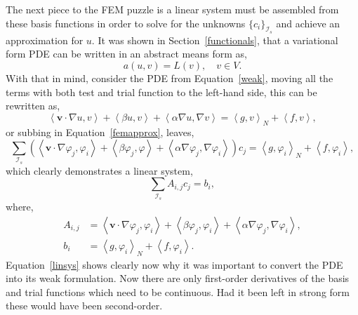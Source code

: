 The next piece to the FEM puzzle is a linear system must be assembled from these basis functions in order to solve for the unknowns $\{c_i\}_{\mathcal{I}_s}$ and achieve an approximation for $u$. It was shown in Section~\ref{functionals}, that a variational form PDE can be written in an abstract means form as,
\begin{equation}
	a(u,v) = L(v),\quad v\in V.
\end{equation}
With that in mind, consider the PDE from Equation~\eqref{weak}, moving all the terms with both test and trial function to the left-hand side, this can be rewritten as,
\begin{equation}
	\left\langle\mathbf{v}\cdot\nabla u,v\right\rangle + \left\langle\beta u,v\right\rangle + \left\langle\alpha\nabla u, \nabla v\right\rangle = \left\langle g,v\right\rangle_N + \left\langle f,v\right\rangle,
\end{equation}
or subbing in Equation~\eqref{femapprox}, leaves,
\begin{equation}\label{linsys}
	\sum_{\mathcal{I}_s}\left(\left\langle\mathbf{v}\cdot\nabla \varphi_j,\varphi_i\right\rangle + \left\langle\beta \varphi_j,\varphi\right\rangle + \left\langle\alpha\nabla \varphi_j, \nabla \varphi_i\right\rangle\right)c_j = \left\langle g,\varphi_i\right\rangle_N + \left\langle f,\varphi_i\right\rangle,
\end{equation}
which clearly demonstrates a linear system,
\begin{equation}
	\sum_{\mathcal{I}_s} A_{i,j}c_j = b_i,
\end{equation}
where,
\begin{align}
	A_{i,j} &= \left\langle\mathbf{v}\cdot\nabla \varphi_j,\varphi_i\right\rangle + \left\langle\beta \varphi_j,\varphi_i\right\rangle + \left\langle\alpha\nabla \varphi_j, \nabla \varphi_i\right\rangle,\\
	b_i &= \left\langle g,\varphi_i\right\rangle_N + \left\langle f,\varphi_i\right\rangle.
\end{align}
Equation~\eqref{linsys} shows clearly now why it was important to convert the PDE into its weak formulation. Now there are only first-order derivatives of the basis and trial functions which need to be continuous. Had it been left in strong form these would have been second-order.

